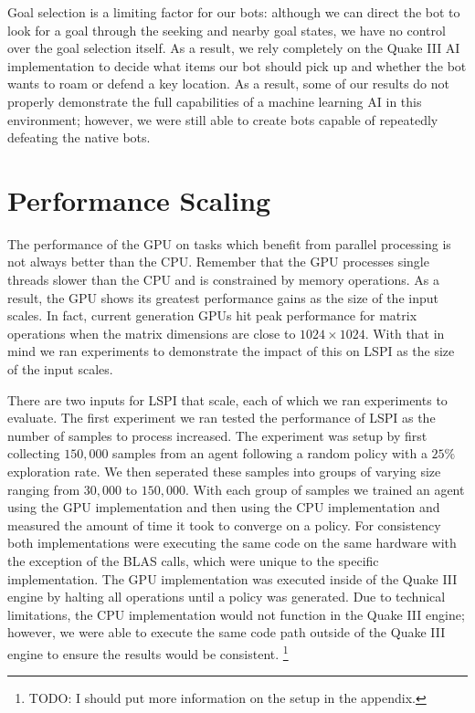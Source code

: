 Goal selection is a limiting factor for our bots: although we can direct the bot to look for a goal through the seeking and nearby goal states, we have no control over the goal selection itself. As a result, we rely completely on the Quake III AI implementation to decide what items our bot should pick up and whether the bot wants to roam or defend a key location. As a result, some of our results do not properly demonstrate the full capabilities of a machine learning AI in this environment; however, we were still able to create bots capable of repeatedly defeating the native bots.

\section{Performance Scaling}

The performance of the GPU on tasks which benefit from parallel processing is not always better than the CPU. Remember that the GPU processes single threads slower than the CPU and is constrained by memory operations. As a result, the GPU shows its greatest performance gains as the size of the input scales. In fact, current generation GPUs hit peak performance for matrix operations when the matrix dimensions are close to $1024 \times 1024$. \cite{cuda:perf} With that in mind we ran experiments to demonstrate the impact of this on LSPI as the size of the input scales.

There are two inputs for LSPI that scale, each of which we ran experiments to evaluate. The first experiment we ran tested the performance of LSPI as the number of samples to process increased. The experiment was setup by first collecting $150,000$ samples from an agent following a random policy with a $25\%$ exploration rate. We then seperated these samples into groups of varying size ranging from $30,000$ to $150,000$. With each group of samples we trained an agent using the GPU implementation and then using the CPU implementation and measured the amount of time it took to converge on a policy. For consistency both implementations were executing the same code on the same hardware with the exception of the BLAS calls, which were unique to the specific implementation. The GPU implementation was executed inside of the Quake III engine by halting all operations until a policy was generated. Due to technical limitations, the CPU implementation would not function in the Quake III engine; however, we were able to execute the same code path outside of the Quake III engine to ensure the results would be consistent. \footnote{TODO: I should put more information on the setup in the appendix.}

